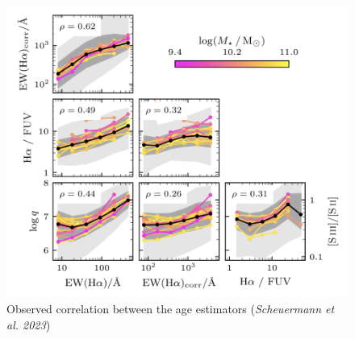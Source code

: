 \documentclass{beamer}
\begin{document}
\begin{frame}
\begin{figure}[H]
    \centering
    \includegraphics[scale = 0.3]{image8.png}
    \caption{Observed correlation between the age estimators (\textit{Scheuermann et al. 2023})}
    \label{fig:image8}
\end{figure}

\end{frame}
\end{document}
